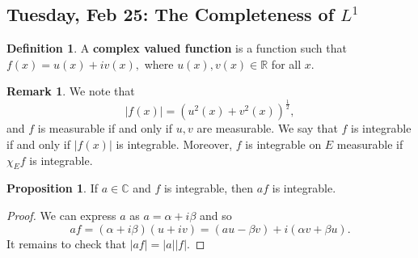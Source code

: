 \documentclass[10pt, oneside]{article}
\newcommand{\bbR}{\mathbb{R}}
\newcommand{\bbC}{\mathbb{C}}
\theoremstyle{definition}
\newtheorem{defn}{Definition}
\newtheorem{prop}{Proposition}
\newtheorem{rem}{Remark}
\begin{document}
\newpage
\subsection{Tuesday, Feb 25: The Completeness of $L^1$}
\begin{defn}
    A \textbf{complex valued function} is a function such that 
    $f(x) = u(x) + iv(x),$ where $u(x), v(x)\in \bbR$ for all $x.$
\end{defn}
\begin{rem}
    We note that 
    \[|f(x)| = (u^2(x) + v^2(x))^\frac{1}{2},\] and $f$ is measurable if and only if $u,v$ are measurable. We say that $f$ is integrable if and only if $|f(x)|$ is integrable. Moreover, $f$ is integrable on $E$ measurable if $\chi_E f$ is integrable. 
\end{rem}
\begin{prop}
    If $a\in \bbC$ and $f$ is integrable, then $af$ is integrable.
\end{prop}
\begin{proof}
    We can express $a$ as $a = \alpha + i\beta$ and so 
    \[af = (\alpha + i \beta)(u + iv) = (au - \beta v) + i(\alpha v + \beta u).\] It remains to check that 
    $|a f| = |a||f|.$
\end{proof}
\end{document}
